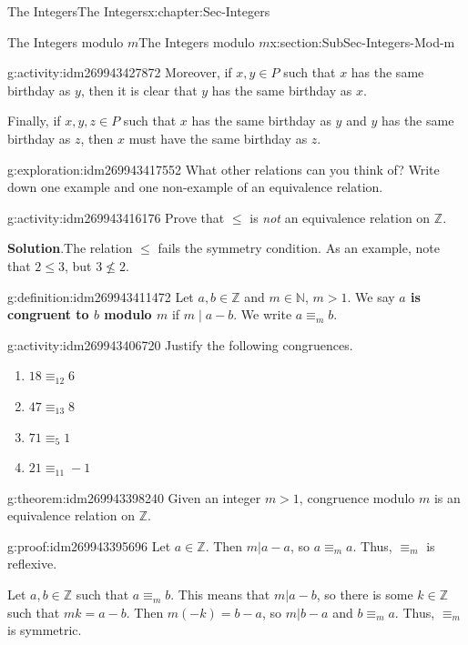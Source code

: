 \documentclass[oneside,10pt,]{book}
\newcommand{\terminology}[1]{\textbf{#1}}
\numberwithin{equation}{section}
\renewcommand{\le}{\leqslant}
\def\Z{{\mathbb Z}}
\def\N{{\mathbb N}}
\begin{document}
\begin{chapterptx}{The Integers}{}{The Integers}{}{}{x:chapter:Sec-Integers}
\begin{sectionptx}{The Integers modulo \(m\)}{}{The Integers modulo \(m\)}{}{}{x:section:SubSec-Integers-Mod-m}
\begin{activity}{}{g:activity:idm269943427872}
Moreover, if \(x,y\in P\) such that \(x\) has the same birthday as \(y\), then it is clear that \(y\) has the same birthday as \(x\).%
\par
Finally, if \(x,y,z\in P\) such that \(x\) has the same birthday as \(y\) and \(y\) has the same birthday as \(z\), then \(x\) must have the same birthday as \(z\).%
\end{activity}
\begin{exploration}{}{g:exploration:idm269943417552}%
What other relations can you think of? Write down one example and one non-example of an equivalence relation.%
\end{exploration}
\begin{activity}{}{g:activity:idm269943416176}%
Prove that \(\le\) is \emph{not} an equivalence relation on \(\Z\).%
\par\smallskip%
\noindent\textbf{Solution}.\hypertarget{g:solution:idm269943413776}{}\quad{}The relation \(\le\) fails the symmetry condition. As an example, note that \(2 \le 3\), but \(3\not\le 2\).%
\end{activity}
\begin{definition}{}{g:definition:idm269943411472}%
Let \(a,b\in \Z\) and \(m \in \N\), \(m > 1\). We say \terminology{\(a\) is congruent to \(b\) modulo \(m\)} if \(m\mid a-b\). We write \(a \equiv_m b\).%
\end{definition}
\begin{activity}{}{g:activity:idm269943406720}%
Justify the following congruences.%
\begin{enumerate}
\item{}\(18 \equiv_{12} 6\)%
\item{}\(47 \equiv_{13} 8\)%
\item{}\(71 \equiv_5 1\)%
\item{}\(21 \equiv_{11} -1\)%
\end{enumerate}
%
\end{activity}
\begin{theorem}{}{}{g:theorem:idm269943398240}%
Given an integer \(m > 1\), congruence modulo \(m\) is an equivalence relation on \(\Z\).%
\end{theorem}
\begin{proofptx}{}{g:proof:idm269943395696}
Let \(a\in \Z\). Then \(m|a-a\), so \(a \equiv_m a\). Thus, \(\equiv_m\) is reflexive.%
\par
Let \(a,b\in \Z\) such that \(a\equiv_m b\). This means that \(m|a-b\), so there is some \(k\in \Z\) such that \(mk = a-b\). Then \(m(-k) = b-a\), so \(m|b-a\) and \(b \equiv_m a\). Thus, \(\equiv_m\) is symmetric.%

\end{proofptx}
\end{sectionptx}
\end{chapterptx}
\end{document}
